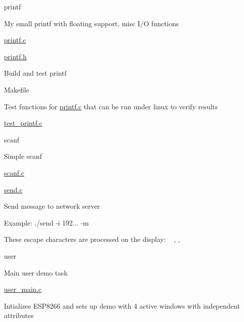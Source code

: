 printf
\begin{DoxyItemize}
\item My small printf with floating support, misc I/O functions
\begin{DoxyItemize}
\item \hyperlink{printf_8c}{printf.\+c}
\item \hyperlink{printf_8h}{printf.\+h}
\end{DoxyItemize}
\item Build and test printf
\begin{DoxyItemize}
\item Makefile
\end{DoxyItemize}
\item Test functions for \hyperlink{printf_8c}{printf.\+c} that can be run under linux to verify results
\begin{DoxyItemize}
\item \hyperlink{test__printf_8c}{test\+\_\+printf.\+c}
\end{DoxyItemize}
\end{DoxyItemize}

scanf
\begin{DoxyItemize}
\item Simple scanf
\begin{DoxyItemize}
\item \hyperlink{scanf_8c}{scanf.\+c}
\end{DoxyItemize}
\end{DoxyItemize}

\hyperlink{send_8c}{send.\+c}
\begin{DoxyItemize}
\item Send message to network server
\item Example\+: ./send -\/i 192... -\/m \textquotesingle{}\textquotesingle{}
\begin{DoxyItemize}
\item These escape characters are processed on the display\+: ~\newline
, , 
\end{DoxyItemize}
\end{DoxyItemize}

user
\begin{DoxyItemize}
\item Main user demo task
\begin{DoxyItemize}
\item \hyperlink{user__main_8c}{user\+\_\+main.\+c}
\end{DoxyItemize}
\item Intializes E\+S\+P8266 and sets up demo with 4 active windows with independent attributes
\end{DoxyItemize}

